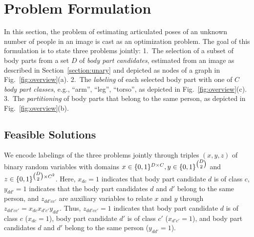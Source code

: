 \section{Problem Formulation}
\label{section:problem}
%
In this section,
the problem of estimating articulated poses of an unknown number of people in an image
is cast as an optimization problem.
%
The goal of this formulation is to state three problems jointly:
%
1.~The selection of a subset of body parts from a set $D$ of \emph{body part candidates},
estimated from an image as described in Section~\ref{section:unary}
and depicted as nodes of a graph in Fig.~\ref{fig:overview}(a).
%
2.~The \emph{labeling} of each selected body part with one of $C$ \emph{body part classes},
e.g., ``arm'', ``leg'', ``torso'',
as depicted in Fig.~\ref{fig:overview}(c).
%
3.~The \emph{partitioning} of body parts that belong to the same person,
as depicted in Fig.~\ref{fig:overview}(b).


\subsection{Feasible Solutions}
\label{section:feasible-solutions}
%
We encode labelings of the three problems jointly through
triples $(x,y,z)$ of binary random variables with domains
$x\in\{0,1\}^{D\times C}, y\in\{0,1\}^{\tbinom{D}{2}}$ and $z\in\{0,1\}^{\tbinom{D}{2} \times C^2}$.
Here, $x_{dc} = 1$ indicates that body part candidate $d$ is of class $c$,
$y_{dd'} = 1$ indicates that the body part candidates $d$ and $d'$ belong to the same person,
and $z_{dd'cc'}$ are auxiliary variables to relate $x$ and $y$ through $z_{dd'cc'} = x_{dc} x_{d'c'} y_{dd'}$.
Thus, $z_{dd'cc'} = 1$ indicates that
body part candidate $d$ is of class $c$ ($x_{dc}=1$),
body part candidate $d'$ is of class $c'$ ($x_{d'c'}=1$),
and body part candidates $d$ and $d'$ belong to the same person ($y_{dd'}=1$).

